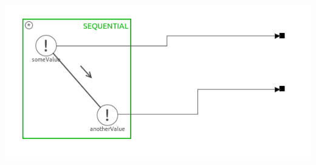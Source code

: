 \documentclass[a4paper,twoside,11pt]{article}
\begin{document}
	\centerline{\includegraphics[width=\linewidth]{./images/1_1-SystemDC_prod.png}}
\subsubsection{}
\end{document}
